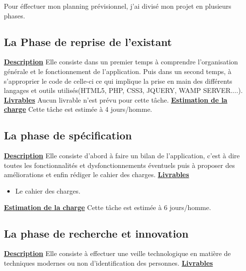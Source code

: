 \documentclass[overfullbox]{polytech/polytech}
\begin{document}
Pour éffectuer mon planning prévisionnel, j'ai divisé mon projet en plusieurs phases.
\subsection{La Phase de reprise de l'existant}
\textbf{\underline{Description}}
\newline
\newline
Elle consiste dans un premier temps à comprendre l'organisation générale et le fonctionnement de l'application. Puis dans un second temps, à s'approprier le code de celle-ci ce qui implique la prise en main des différents langages et outils utilisés(HTML5, PHP, CSS3, JQUERY, WAMP SERVER....).
\newline
\newline
\textbf{\underline{Livrables}}
\newline
\newline
Aucun livrable n'est prévu pour cette tâche.
\newline
\newline
\textbf{\underline{Estimation de la charge}}
\newline
\newline
Cette tâche est estimée à 4 jours/homme.


\subsection{La phase de spécification}
\textbf{\underline{Description}}
\newline
\newline
Elle consiste d'abord à faire un bilan de l'application, c'est à dire toutes les fonctionnalités et dysfonctionnements éventuels puis à proposer des améliorations et enfin rédiger le cahier des charges.
\newline
\newline
\textbf{\underline{Livrables}}
\begin{itemize}
\item Le cahier des charges.
\newline
\end{itemize}	

\textbf{\underline{Estimation de la charge}}
\newline
\newline
Cette tâche est estimée à 6 jours/homme.

\subsection{La phase de recherche et innovation}
\textbf{\underline{Description}}
\newline
\newline
Elle consiste à effectuer une veille technologique en matière de techniques modernes ou non d'identification des personnes.
\newline
\newline
\textbf{\underline{Livrables}}
\end{document}
